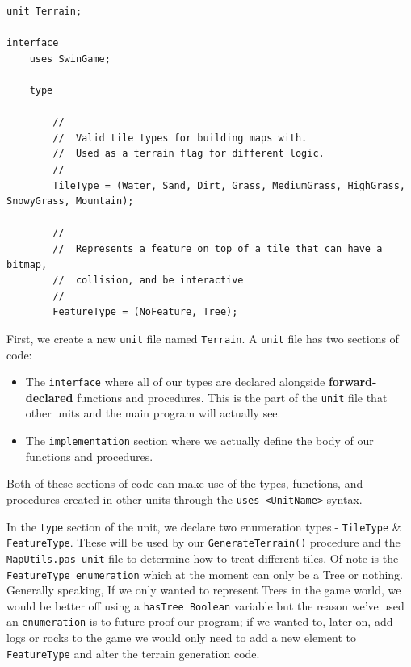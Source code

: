 \documentclass{article}
\begin{document}
\begin{verbatim}
unit Terrain;

interface
	uses SwinGame;

	type

		//
		//	Valid tile types for building maps with.
		//	Used as a terrain flag for different logic.
		//
		TileType = (Water, Sand, Dirt, Grass, MediumGrass, HighGrass, SnowyGrass, Mountain);

		//
		//	Represents a feature on top of a tile that can have a bitmap,
		//	collision, and be interactive
		//
		FeatureType = (NoFeature, Tree);
\end{verbatim}

First, we create a new \texttt{unit} file named \texttt{Terrain}. A \texttt{unit} file has two sections of code: 

\begin{itemize}

\item
The \texttt{interface} where all of our types are declared alongside \textbf{forward-declared} functions and procedures. This is the part of the \texttt{unit} file that other units and the main program will actually see.

\item
The  \texttt{implementation} section where we actually define the body of our functions and procedures.

\end{itemize}

Both of these sections of code can make use of the types, functions, and procedures created in other units through the \texttt{uses <UnitName>} syntax.

In the \texttt{type} section of the unit, we declare two enumeration types.- \texttt{TileType} \& \texttt{FeatureType}. These will be used by our \texttt{GenerateTerrain()} procedure and the \texttt{MapUtils.pas unit} file to determine how to treat different tiles. Of note is the \texttt{FeatureType enumeration} which at the moment can only be a Tree or nothing. Generally speaking, If we only wanted to represent Trees in the game world, we would be better off using a \texttt{hasTree Boolean} variable but the reason we've used an \texttt{enumeration} is to future-proof our program; if we wanted to, later on, add logs or rocks to the game we would only need to add a new element to \texttt{FeatureType} and alter the terrain generation code.
\end{document}
